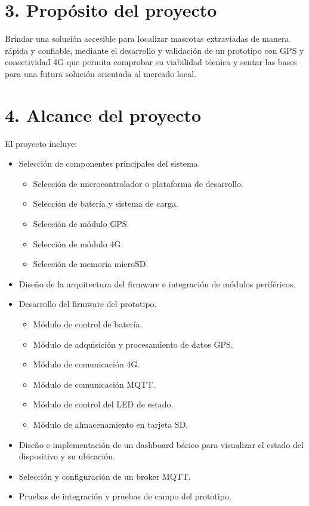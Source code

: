 \documentclass[
11pt, %
]{charter}
\begin{document}
\section{3. Propósito del proyecto}
\label{sec:proposito}

Brindar una solución accesible para localizar mascotas extraviadas de manera rápida y confiable, mediante el desarrollo y validación de un prototipo con GPS y conectividad 4G que permita comprobar su viabilidad técnica y sentar las bases para una futura solución orientada al mercado local.


\section{4. Alcance del proyecto}
\label{sec:alcance}

El proyecto incluye:
\begin{itemize}
	\item Selección de componentes principales del sistema.
	\begin{itemize}
		\item Selección de microcontrolador o plataforma de desarrollo.
		\item Selección de batería y sistema de carga.
		\item Selección de módulo GPS.
		\item Selección de módulo 4G.
		\item Selección de memoria microSD.
	\end{itemize}
	\item Diseño de la arquitectura del firmware e integración de módulos periféricos.
	\item Desarrollo del firmware del prototipo.
	\begin{itemize}
		\item Módulo de control de batería.
		\item Módulo de adquisición y procesamiento de datos GPS.
		\item Módulo de comunicación 4G.
		\item Módulo de comunicación MQTT.
		\item Módulo de control del LED de estado.
		\item Módulo de almacenamiento en tarjeta SD.
	\end{itemize}
	\item Diseño e implementación de un dashboard básico para visualizar el estado del dispositivo y su ubicación.
	\item Selección y configuración de un broker MQTT.
	\item Pruebas de integración y pruebas de campo del prototipo.
\end{itemize}
\end{document}
